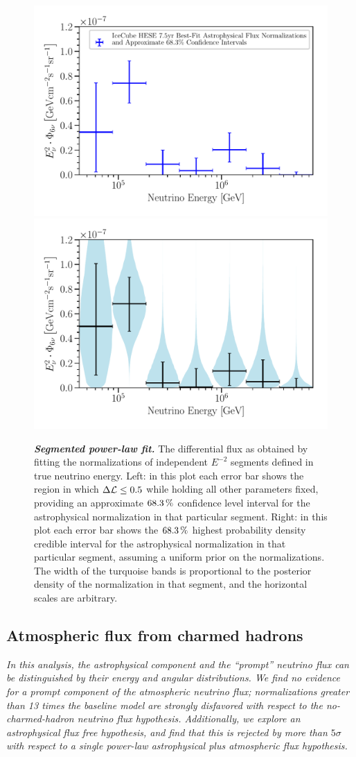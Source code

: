 \begin{figure}[ht]
	\centering
	\includegraphics[width=0.45\linewidth]{figures/hese_paper/unfolded_spectrum_freq}
	\includegraphics[width=0.45\linewidth]{figures/hese_paper/unfolded_spectrum}
	\internallinenumbers
	\caption{\textbf{\textit{Segmented power-law fit.}}
		The differential flux as obtained by fitting the normalizations of independent $E^{-2}$ segments defined in true neutrino energy.
		Left: in this plot each error bar shows the region in which $\Delta\mathcal{L}\leq0.5$ while holding all other parameters fixed, providing an approximate $\SI{68.3}\percent$ confidence level interval for the astrophysical normalization in that particular segment.
		Right: in this plot each error bar shows the $\SI{68.3}\percent$ highest probability density credible interval for the astrophysical normalization in that particular segment, assuming a uniform prior on the normalizations.
		The width of the turquoise bands is proportional to the posterior density of the normalization in that segment, and the horizontal scales are arbitrary.}\label{fig:segmented}
\end{figure}


\subsection{Atmospheric flux from charmed hadrons\label{sec:prompt}}

\noindent
\textit{%
	In this analysis, the astrophysical component and the ``prompt'' neutrino flux can be distinguished by their energy and angular distributions.
	We find no evidence for a prompt component of the atmospheric neutrino flux; normalizations greater than 13 times the baseline model are strongly disfavored with respect to the no-charmed-hadron neutrino flux hypothesis.
	Additionally, we explore an astrophysical flux free hypothesis, and find that this is rejected by more than $5\sigma$ with respect to a single power-law astrophysical plus atmospheric flux hypothesis.
}
\newline

